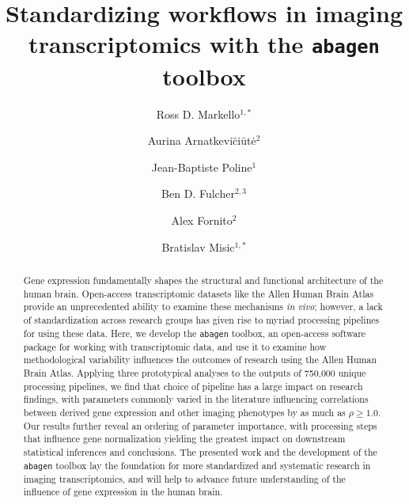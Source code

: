 \documentclass[12pt,aps,pra,reprint,showkeys]{revtex4-1}
\begin{document}
\title{Standardizing workflows in imaging transcriptomics with the \texttt{abagen} toolbox}
\author{Ross D. Markello$^{1,*}$}
\author{Aurina Arnatkevi\u{c}i\={u}t\.{e}$^{2}$}
\author{Jean-Baptiste Poline$^{1}$}
\author{Ben D. Fulcher$^{2,3}$}
\author{Alex Fornito$^{2}$}
\author{Bratislav Misic$^{1,*}$}


\begin{abstract}
\noindent Gene expression fundamentally shapes the structural and functional architecture of the human brain.
Open-access transcriptomic datasets like the Allen Human Brain Atlas provide an unprecedented ability to examine these mechanisms \emph{in vivo}; however, a lack of standardization across research groups has given rise to myriad processing pipelines for using these data.
Here, we develop the \texttt{abagen} toolbox, an open-access software package for working with transcriptomic data, and use it to examine how methodological variability influences the outcomes of research using the Allen Human Brain Atlas.
Applying three prototypical analyses to the outputs of 750,000 unique processing pipelines, we find that choice of pipeline has a large impact on research findings, with parameters commonly varied in the literature influencing correlations between derived gene expression and other imaging phenotypes by as much as $\rho \geq 1.0$.
Our results further reveal an ordering of parameter importance, with processing steps that influence gene normalization yielding the greatest impact on downstream statistical inferences and conclusions.
The presented work and the development of the \texttt{abagen} toolbox lay the foundation for more standardized and systematic research in imaging transcriptomics, and will help to advance future understanding of the influence of gene expression in the human brain.
\end{abstract}

\end{document}
